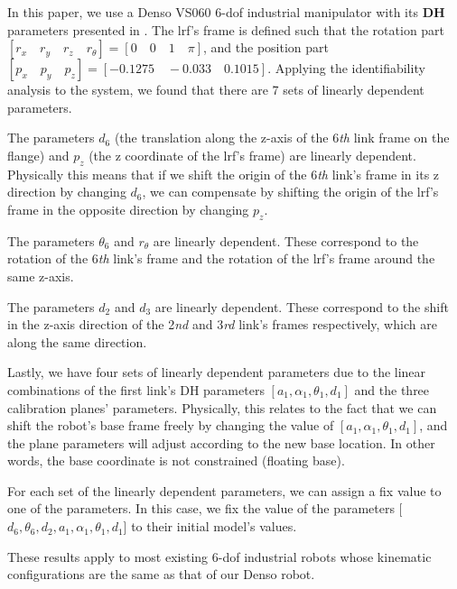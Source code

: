 In this paper, we use a Denso VS060 6-\ac{dof} industrial manipulator with its \textbf{DH} parameters presented in . The \ac{lrf}'s frame is defined such that the rotation part $[r_x \quad r_y \quad r_z \quad r_{\theta}] = [0 \quad 0 \quad 1 \quad \pi]$, and the position part $[p_x \quad p_y\quad p_z] = [-0.1275 \quad -0.033 \quad 0.1015]$. Applying the identifiability analysis to the system, we found that there are 7 sets of linearly dependent parameters. 
\begin{compactenum}
\item The parameters $d_6$ (the translation along the z-axis of the 6\textit{th} link frame on the flange) and $p_z$ (the z coordinate of the \ac{lrf}'s frame) are linearly dependent. Physically this means that if we shift the origin of the 6\textit{th} link's frame  in its z direction by changing $d_6$, we can compensate by shifting the origin of the \ac{lrf}'s frame in the opposite direction by changing $p_z$.
\item The parameters $\theta_6$ and $r_\theta$ are linearly dependent. These correspond to the rotation of the 6\textit{th} link's frame and the rotation of the \ac{lrf}'s frame around the same z-axis. 
\item The parameters $d_2$ and $d_3$ are linearly dependent. These correspond to the shift in the z-axis direction of the 2\textit{nd} and 3\textit{rd} link's frames respectively, which are along the same direction. 
\item Lastly, we have four sets of linearly dependent parameters due to the linear combinations of the first link's DH parameters $[a_1, \alpha_1, \theta_1, d_1 ]$ and the three calibration planes' parameters. Physically, this relates to the fact that we can shift the robot's base frame freely by changing the value of $[a_1, \alpha_1, \theta_1, d_1]$, and the plane parameters will adjust according to the new base location. In other words, the base coordinate is not constrained (floating base). 
\end{compactenum}

For each set of the linearly dependent parameters, we can assign a fix value to one of the parameters. In this case, we fix the value of the parameters [$d_6, \theta_6, d_2, a_1, \alpha_1, \theta_1, d_1$] to their initial model's values. 

These results apply to most existing 6-\ac{dof} industrial robots whose kinematic configurations are the same as that of our Denso robot.


